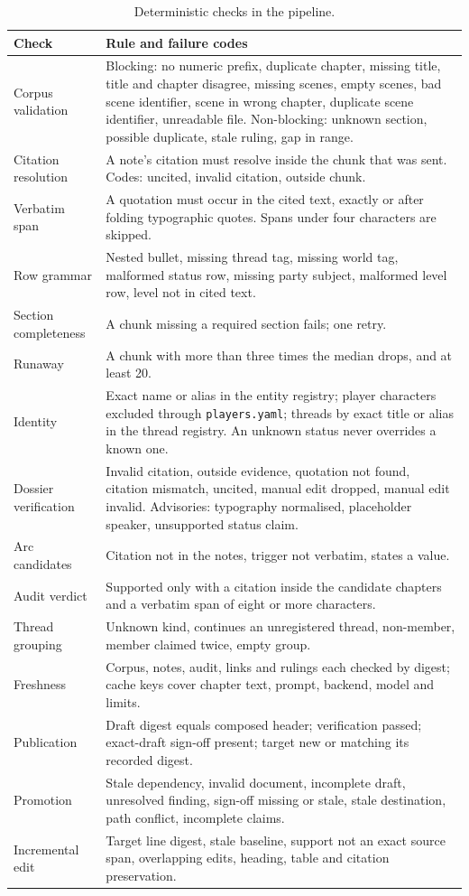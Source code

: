 \documentclass[11pt]{article}
\newcommand{\code}[1]{\texttt{#1}}
\begin{document}
\begin{table}[h]
\small
\begin{tabularx}{\textwidth}{@{}p{3.6cm}Y@{}}
\toprule
Check & Rule and failure codes \\
\midrule
Corpus validation & Blocking: no numeric prefix, duplicate chapter, missing title,
title and chapter disagree, missing scenes, empty scenes, bad scene identifier, scene in
wrong chapter, duplicate scene identifier, unreadable file. Non-blocking: unknown
section, possible duplicate, stale ruling, gap in range. \\
Citation resolution & A note's citation must resolve inside the chunk that was sent.
Codes: uncited, invalid citation, outside chunk. \\
Verbatim span & A quotation must occur in the cited text, exactly or after folding
typographic quotes. Spans under four characters are skipped. \\
Row grammar & Nested bullet, missing thread tag, missing world tag, malformed status
row, missing party subject, malformed level row, level not in cited text. \\
Section completeness & A chunk missing a required section fails; one retry. \\
Runaway & A chunk with more than three times the median drops, and at least 20. \\
Identity & Exact name or alias in the entity registry; player characters excluded
through \code{players.yaml}; threads by exact title or alias in the thread registry. An
unknown status never overrides a known one. \\
Dossier verification & Invalid citation, outside evidence, quotation not found,
citation mismatch, uncited, manual edit dropped, manual edit invalid. Advisories:
typography normalised, placeholder speaker, unsupported status claim. \\
Arc candidates & Citation not in the notes, trigger not verbatim, states a value. \\
Audit verdict & Supported only with a citation inside the candidate chapters and a
verbatim span of eight or more characters. \\
Thread grouping & Unknown kind, continues an unregistered thread, non-member, member
claimed twice, empty group. \\
Freshness & Corpus, notes, audit, links and rulings each checked by digest; cache keys
cover chapter text, prompt, backend, model and limits. \\
Publication & Draft digest equals composed header; verification passed; exact-draft
sign-off present; target new or matching its recorded digest. \\
Promotion & Stale dependency, invalid document, incomplete draft, unresolved finding,
sign-off missing or stale, stale destination, path conflict, incomplete claims. \\
Incremental edit & Target line digest, stale baseline, support not an exact source
span, overlapping edits, heading, table and citation preservation. \\
\bottomrule
\end{tabularx}
\caption{Deterministic checks in the pipeline.}
\end{table}
\end{document}

